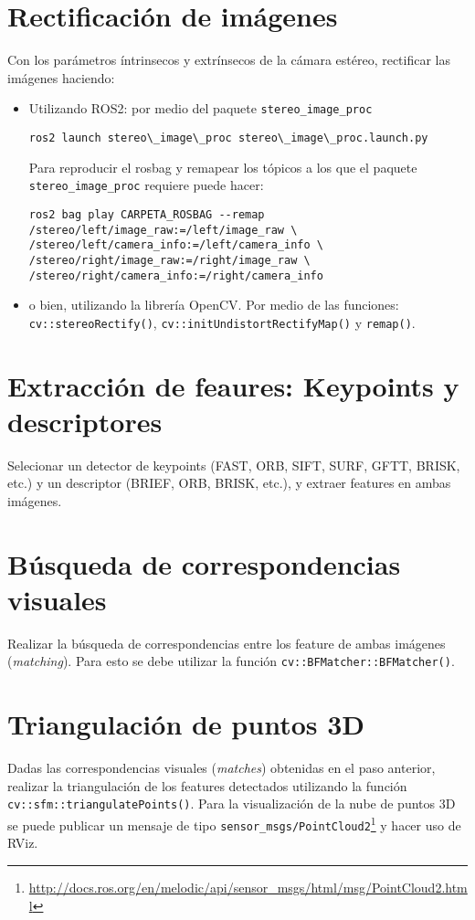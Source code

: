 \documentclass[tp]{lcc}
\begin{document}
\section{Rectificación de imágenes}

Con los parámetros íntrinsecos y extrínsecos de la cámara estéreo, rectificar las imágenes haciendo:

\begin{itemize}
    \item Utilizando ROS2: por medio del paquete \lstinline{stereo_image_proc}
    
\begin{lstlisting}[style=bash]     
ros2 launch stereo\_image\_proc stereo\_image\_proc.launch.py
\end{lstlisting}

Para reproducir el rosbag y remapear los tópicos a los que el paquete \lstinline{stereo_image_proc} requiere puede hacer:
\begin{lstlisting}[style=bash]   
ros2 bag play CARPETA_ROSBAG --remap /stereo/left/image_raw:=/left/image_raw \
/stereo/left/camera_info:=/left/camera_info \
/stereo/right/image_raw:=/right/image_raw \
/stereo/right/camera_info:=/right/camera_info
\end{lstlisting}


    \item o bien, utilizando la librería OpenCV. Por medio de las funciones: \lstinline{cv::stereoRectify()},  \lstinline{cv::initUndistortRectifyMap()} y  \lstinline{remap()}.

\end{itemize}

\section{Extracción de feaures: Keypoints y descriptores}
Selecionar un detector de keypoints (FAST, ORB, SIFT, SURF, GFTT, BRISK, etc.) y un descriptor (BRIEF, ORB, BRISK, etc.), y extraer features en ambas imágenes.

\section{Búsqueda de correspondencias visuales}
Realizar la búsqueda de correspondencias entre los feature de ambas imágenes (\emph{matching}). Para esto se debe utilizar la función \lstinline{cv::BFMatcher::BFMatcher()}. 

\section{Triangulación de puntos 3D}
Dadas las correspondencias visuales (\emph{matches}) obtenidas en el paso anterior, realizar la triangulación de los features detectados utilizando la función \lstinline{cv::sfm::triangulatePoints()}. Para la visualización de la nube de puntos 3D se puede publicar un mensaje de tipo \lstinline{sensor_msgs/PointCloud2}\footnote{\url{http://docs.ros.org/en/melodic/api/sensor_msgs/html/msg/PointCloud2.html}} y hacer uso de RViz.
\end{document}
